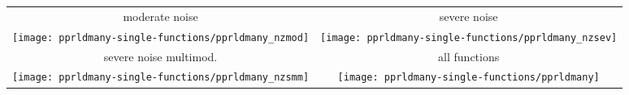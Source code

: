 \documentclass[sigconf]{acmart}
\begin{document}
{%


\begin{figure*}
	\centering
	\begin{tabular}{@{}c@{}c@{}}
		{\Large\sffamily moderate noise} & {\Large\sffamily severe noise}\\
		\texttt{[image: pprldmany-single-functions/pprldmany\_nzmod]} & 
		\texttt{[image: pprldmany-single-functions/pprldmany\_nzsev]}\\[0.5em]
		{\Large\sffamily severe noise multimod.} & {\Large\sffamily all functions}\\
		\texttt{[image: pprldmany-single-functions/pprldmany\_nzsmm]} &
		\texttt{[image: pprldmany-single-functions/pprldmany]}\\[-0.5em]
	\end{tabular}
\caption{\label{fig:ECDFs} \bbobecdfcaptionallgroups}
\end{figure*}




}
\end{document}
